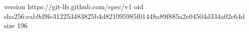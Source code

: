 version https://git-lfs.github.com/spec/v1
oid sha256:eab9d9fe312253483825b4d821095985f01448a89f885a2e04504d334a02c64d
size 196
